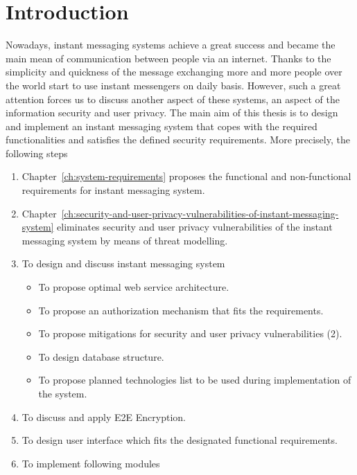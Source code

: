 \chapter{Introduction}\label{ch:introduction}
Nowadays, instant messaging systems achieve a great success and became the main mean of communication
between people via an internet.
Thanks to the simplicity and quickness of the message exchanging more and more people over the world start to use
instant messengers on daily basis.
However, such a great attention forces us to discuss another aspect of these systems, an aspect of the
information security and user privacy.
The main aim of this thesis is to design and implement an instant messaging system
that copes with the required functionalities and satisfies the defined security requirements.
More precisely, the following steps
\begin{enumerate}
    \item Chapter~\ref{ch:system-requirements} proposes the functional and non-functional requirements for instant messaging system.
    \item Chapter~\ref{ch:security-and-user-privacy-vulnerabilities-of-instant-messaging-system}
    eliminates security and user privacy vulnerabilities of the instant messaging system by means of threat modelling.
    \item To design and discuss instant messaging system
    \begin{itemize}
        \item To propose optimal web service architecture.
        \item To propose an authorization mechanism that fits the requirements.
        \item To propose mitigations for security and user privacy vulnerabilities (2).
        \item To design database structure.
        \item To propose planned technologies list to be used during implementation of the system.
    \end{itemize}
    \item To discuss and apply E2E Encryption.
    \item To design user interface which fits the designated functional requirements.
    \item To implement following modules
    \begin{itemize}

\end{itemize}
\end{enumerate}
